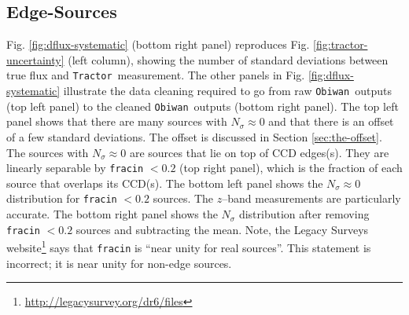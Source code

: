 \documentclass[a4paper,fleqn,usenatbib]{mnras}
\newcommand{\rhalf}{r_{\rm{half}}}
\newcommand{\zb}{$z$}
\newcommand{\tractor}{{\tt Tractor}}
\newcommand{\legacypipe}{{\tt Legacypipe}}
\newcommand{\obiwan}{{\tt Obiwan}}
\begin{document}


\subsection{Edge-Sources}
\label{sec:edge-sources}

Fig. \ref{fig:dflux-systematic} (bottom right panel) reproduces Fig. \ref{fig:tractor-uncertainty} (left column), showing the number of standard deviations between true flux and \tractor\, measurement. The other panels in Fig. \ref{fig:dflux-systematic} illustrate the data cleaning required to go from raw \obiwan\, outputs (top left panel) to the cleaned \obiwan\, outputs (bottom right panel). The top left panel shows that there are many sources with $N_\sigma \approx 0$ and that there is an offset of a few standard deviations. The offset is discussed in Section \ref{sec:the-offset}. The sources with $N_\sigma \approx 0$ are sources that lie on top of CCD edges(s). They are linearly separable by {\tt{fracin}} $< 0.2$ (top right panel), which is the fraction of each source that overlaps its CCD(s). The bottom left panel shows the $N_\sigma \approx 0$ distribution for {\tt{fracin}} $< 0.2$ sources. The \zb--band measurements are particularly accurate. The bottom right panel shows the $N_\sigma$ distribution after removing {\tt{fracin}} $< 0.2$ sources and subtracting the mean. Note, the Legacy Surveys website\footnote{\url{http://legacysurvey.org/dr6/files}} says that {\tt{fracin}} is ``near unity for real sources''. This statement is incorrect; it is near unity for non-edge sources.
\end{document}
